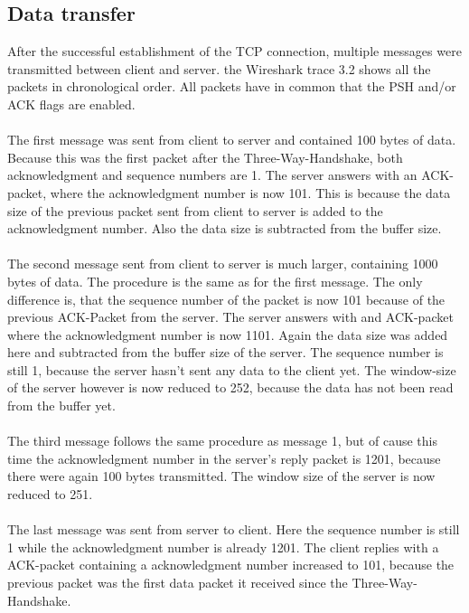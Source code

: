\subsection{Data transfer}
After the successful establishment of the TCP connection, multiple messages were transmitted between client and server. the Wireshark trace 3.2 shows all the packets in chronological order. All packets have in common that the PSH and/or ACK flags are enabled. 
\\\\
The first message was sent from client to server and contained 100 bytes of data. Because this was the first packet after the Three-Way-Handshake, both acknowledgment and sequence numbers are 1. The server answers with an ACK-packet, where the acknowledgment number is now 101. This is because the data size of the previous packet sent from client to server is added to the acknowledgment number. Also the data size is subtracted from the buffer size.
\\\\
The second message sent from client to server is much larger, containing 1000 bytes of data. The procedure is the same as for the first message. The only difference is, that the sequence number of the packet is now 101 because of the previous ACK-Packet from the server. The server answers with and ACK-packet where the acknowledgment number is now 1101. Again the data size was added here and subtracted from the buffer size of the server. The sequence number is still 1, because the server hasn't sent any data to the client yet. The window-size of the server however is now reduced to 252, because the data has not been read from the buffer yet.
\\\\
The third message follows the same procedure as message 1, but of cause this time the acknowledgment number in the server's reply packet is 1201, because there were again 100 bytes transmitted. The window size of the server is now reduced to 251.
\\\\
The last message was sent from server to client. Here the sequence number is still 1 while the acknowledgment number is already 1201. The client replies with a ACK-packet containing a acknowledgment number increased to 101, because the previous packet was the first data packet it received since the Three-Way-Handshake.

